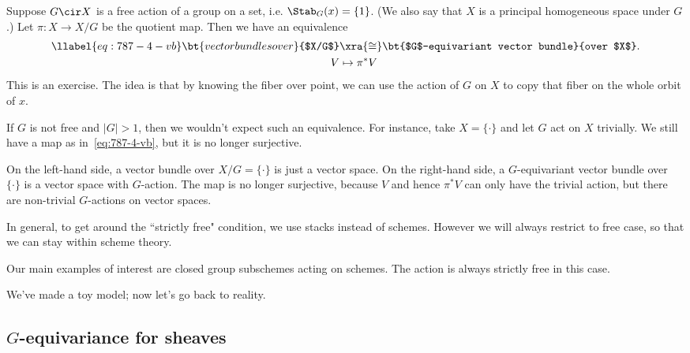 Suppose $G\cir X$ is a free action of a group on a set, i.e. $\Stab_G(x)=\{1\}$. (We also say that $X$ is a principal homogeneous space under $G$.) Let $\pi:X\to X/G$ be the quotient map. Then we have an equivalence
\begin{align}
\llabel{eq:787-4-vb}
\bt{vector bundles over}{$X/G$}&\xra{\cong} \bt{$G$-equivariant vector bundle}{over $X$}.\\
\nonumber
V&\mapsto \pi^*V
\end{align}
This is an exercise. %
The idea is that by knowing the fiber over point, we can use the action of $G$ on $X$ to copy that fiber on the whole orbit of $x$. 
\begin{rem}
If $G$ is not free and $|G|>1$, then we wouldn't expect such an equivalence. For instance, take $X=\{\cdot \}$ and let $G$ act on $X$ trivially. We still have a map as in~\eqref{eq:787-4-vb}, but it is no longer surjective.

On the left-hand side, a vector bundle over $X/G=\{\cdot \}$ is just a vector space. On the right-hand side, a $G$-equivariant vector bundle over $\{\cdot\}$ is a vector space with $G$-action. %
The map is no longer surjective, because $V$ and hence $\pi^*V$ can only have the trivial action, but there are non-trivial $G$-actions on vector spaces.
\end{rem}

In general, to get around the ``strictly free" condition, we use stacks instead of schemes. However we will always restrict to free case, so that we can stay within scheme theory.

Our main examples of interest are closed group subschemes acting on schemes. The action is always strictly free in this case.

We've made a toy model; now let's go back to reality.
\subsection{$G$-equivariance for sheaves}


